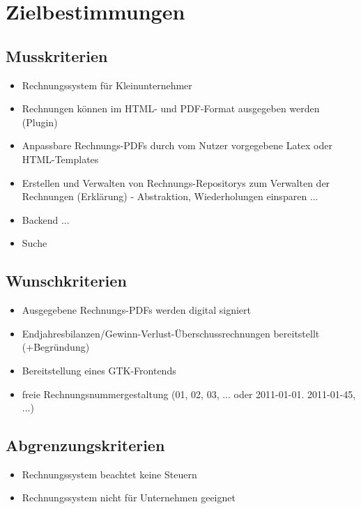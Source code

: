 
\section{Zielbestimmungen}



\subsection{Musskriterien}

\begin{itemize}
	\item Rechnungssystem für Kleinunternehmer
	\item Rechnungen können im HTML- und PDF-Format ausgegeben werden (Plugin)
	\item Anpassbare Rechnungs-PDFs durch vom Nutzer vorgegebene Latex oder HTML-Templates
	\item Erstellen und Verwalten von Rechnungs-Repositorys zum Verwalten der Rechnungen (Erklärung) - Abstraktion, Wiederholungen einsparen ...
	\item Backend ... 
	\item Suche
\end{itemize}

\subsection{Wunschkriterien}

\begin{itemize}
	\item Ausgegebene Rechnungs-PDFs werden digital signiert
	\item Endjahresbilanzen/Gewinn-Verlust-Überschussrechnungen bereitstellt (+Begründung)
	\item Bereitstellung eines GTK-Frontends
	\item freie Rechnungsnummergestaltung (01, 02, 03, ... oder 2011-01-01. 2011-01-45, ...)
\end{itemize}

\subsection{Abgrenzungskriterien}

\begin{itemize}
	\item Rechnungssystem beachtet keine Steuern
	\item Rechnungssystem nicht für Unternehmen geeignet
\end{itemize}